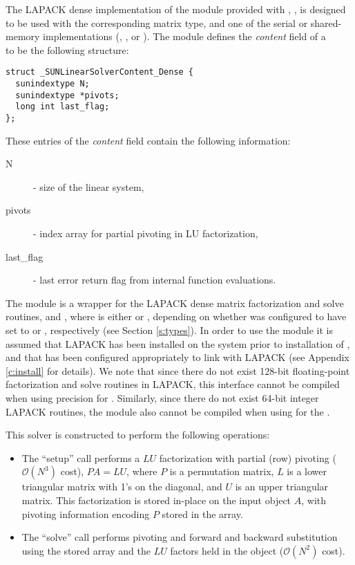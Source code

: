 
The LAPACK dense implementation of the {\sunlinsol} module provided
with {\sundials}, {\sunlinsollapdense}, is designed to be used with the 
corresponding {\sunmatdense} matrix type, and one of the serial or
shared-memory {\nvector} implementations ({\nvecs}, {\nvecopenmp}, or
{\nvecpthreads}).  The {\sunlinsollapdense} module defines the {\em
content} field of a \\
\noindent{} to be the following structure:
\begin{verbatim} 
struct _SUNLinearSolverContent_Dense {
  sunindextype N;
  sunindextype *pivots;
  long int last_flag;
};
\end{verbatim}
These entries of the \emph{content} field contain the following
information:
\begin{description}
  \item[N] - size of the linear system,
  \item[pivots] - index array for partial pivoting in LU factorization,
  \item[last\_flag] - last error return flag from internal function evaluations.
\end{description}

{\warn} The {\sunlinsollapdense} module is a {\sunlinsol} wrapper for
the LAPACK dense matrix factorization and solve routines, 
and , where \id{*} is either  or , depending on
whether {\sundials} was configured to have  set to
 or , respectively (see Section \ref{s:types}).
In order to use the {\sunlinsollapdense} module it is assumed
that LAPACK has been installed on the system prior to installation of
{\sundials}, and that {\sundials} has been configured appropriately to
link with LAPACK (see Appendix \ref{c:install} for details).  
We note that since there do not exist 128-bit floating-point
factorization and solve routines in LAPACK, this interface cannot be
compiled when using  precision for .
Similarly, since there do not exist 64-bit integer LAPACK routines,
the {\sunlinsollapdense} module also cannot be compiled when using
 for the .

This solver is constructed to perform the following operations:
\begin{itemize}
\item The ``setup'' call performs a $LU$ factorization with
  partial (row) pivoting ($\mathcal O(N^3)$ cost), $PA=LU$, where $P$
  is a permutation matrix, $L$ is a lower triangular matrix with 1's
  on the diagonal, and $U$ is an upper triangular matrix.  This
  factorization is stored in-place on the input {\sunmatdense} object
  $A$, with pivoting information encoding $P$ stored in
  the  array.
\item The ``solve'' call performs pivoting and forward and
  backward substitution using the stored  array and the
  $LU$ factors held in the {\sunmatdense} object ($\mathcal O(N^2)$
  cost).
\end{itemize}

